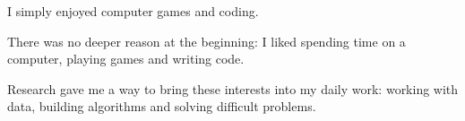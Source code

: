 \documentclass[aspectratio=169,11pt]{beamer}
\begin{document}
\begin{frame}{I simply enjoyed computer games and coding.}
  \vspace{0.32cm}
  {\color{Navy}\fontsize{15}{21}\selectfont
    There was no deeper reason at the beginning: I liked spending time on
    a computer, playing games and writing code.
  \par}

  \vspace{0.48cm}
  {\color{Muted}\fontsize{14}{20}\selectfont
    Research gave me a way to bring these interests into my daily work:
    working with data, building algorithms and solving difficult problems.
  \par}
\end{frame}
\end{document}
